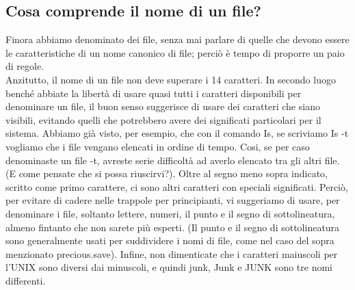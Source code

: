 \subsection{Cosa comprende il nome di un file?}
Finora abbiamo denominato dei file, senza mai parlare di quelle che devono essere le
caratteristiche di un nome canonico di file; perciò è tempo di proporre un paio di regole.\\
Anzitutto, il nome di un file non deve superare i 14 caratteri. In secondo luogo
benché abbiate la libertà di usare quasi tutti i caratteri disponibili per denominare un
file, il buon senso suggerisce di usare dei caratteri che siano visibili, evitando quelli
che potrebbero avere dei significati particolari per il sistema. Abbiamo già visto, per
esempio, che con il comando Is, se scriviamo Is -t vogliamo che i file vengano elencati
in ordine di tempo. Cosi, se per caso denominaste un file -t, avreste serie difficoltà ad
averlo elencato tra gli altri file. (E come pensate che si possa riuscirvi?). Oltre al segno 
meno sopra indicato, scritto come primo carattere, ci sono altri caratteri con speciali
significati. Perciò, per evitare di cadere nelle trappole per principianti, vi suggeriamo 
di usare, per denominare i file, soltanto lettere, numeri, il punto e il segno di
sottolineatura, almeno fintanto che non sarete più esperti. (Il punto e il segno di sottolineatura 
sono generalmente usati per suddividere i nomi di file, come nel caso del
sopra menzionato precious.save). Infine, non dimenticate che i caratteri maiuscoli
per l'UNIX sono diversi dai minuscoli, e quindi junk, Junk e JUNK sono tre nomi differenti.
